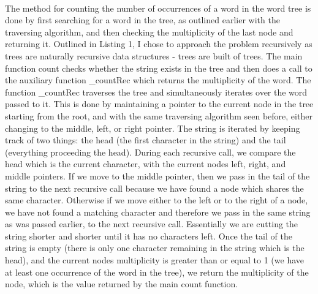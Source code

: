 \documentclass{article}
\begin{document}
  \\[12pt]
  \indent The method for counting the number of occurrences of a word in the word tree is done by first searching for a word in the tree, as outlined earlier with the traversing algorithm, and then checking the multiplicity of the last node and returning it. Outlined in Listing 1, I chose to approach the problem recursively as trees are naturally recursive data structures - trees are built of trees. The main function count checks whether the string exists in the tree and then does a call to the auxiliary function \_countRec which returns the multiplicity of the word. The function \_countRec traverses the tree and simultaneously iterates over the word passed to it. This is done by maintaining a pointer to the current node in the tree starting from the root, and with the same traversing algorithm seen before, either changing to the middle, left, or right pointer. The string is iterated by keeping track of two things: the head (the first character in the string) and the tail (everything proceeding the head). During each recursive call, we compare the head which is the current character, with the current nodes left, right, and middle pointers. If we move to the middle pointer, then we pass in the tail of the string to the next recursive call because we have found a node which shares the same character. Otherwise if we move either to the left or to the right of a node, we have not found a matching character and therefore we pass in the same string as was passed earlier, to the next recursive call. Essentially we are cutting the string shorter and shorter until it has no characters left. Once the tail of the string is empty (there is only one character remaining in the string which is the head), and the current nodes multiplicity is greater than or equal to 1 (we have at least one occurrence of the word in the tree), we return the multiplicity of the node, which is the value returned by the main count function.
\end{document}
